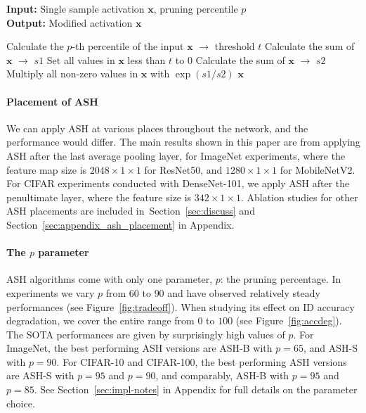 \documentclass{article}
\newcommand{\figref}[1]{Figure~\ref{fig:#1}}
\newcommand{\secref}[1]{Section~\ref{sec:#1}}
\newcommand{\alglabel}[1]{\label{alg:#1}}
\newcommand{\ac}{ASH\xspace}
\begin{document}
\begin{minipage}{0.34\textwidth}
    \begin{algorithm}[H]
    \small
    	\caption{\textbf{\textcolor{ashscolor}{ASH-S: Activation Shaping with Scaling}}}
\textbf{Input:} Single sample activation $\mathbf{x}$, pruning percentile $p$\\
        \textbf{Output:} Modified activation $\mathbf{x}$\\
        \begin{algorithmic}[1]
            \STATE Calculate the $p$-th percentile of the input $\mathbf{x}$ $\rightarrow$ threshold $t$
            \STATE Calculate the sum of $\mathbf{x}$ $\rightarrow$ $s1$
            \STATE Set all values in $\mathbf{x}$ less than $t$ to $0$
            \STATE Calculate the sum of $\mathbf{x}$ $\rightarrow$ $s2$
        	\vspace{0.35cm}
            \STATE Multiply all non-zero values in $\mathbf{x}$ with $\exp(s1/s2)$
            \RETURN $\mathbf{x}$
        \end{algorithmic}
    	\alglabel{ash-s}
    \end{algorithm}
\end{minipage}

\paragraph{Placement of ASH} 
We can apply \ac at various places throughout the network, and the performance would differ. The main results shown in this paper are from applying \ac after the last average pooling layer, for ImageNet experiments, where the feature map size is $2048\times1\times1$ for ResNet50, and $1280\times1\times1$ for MobileNetV2. For CIFAR experiments conducted with DenseNet-101, we apply \ac after the penultimate layer, where the feature size is $342\times1\times1$. Ablation studies for other ASH placements are included in~\secref{discuss} and \secref{appendix_ash_placement} in Appendix.



\paragraph{The $p$ parameter} \ac algorithms come with only one parameter, $p$: the pruning percentage. In experiments we vary $p$ from $60$ to $90$ and have observed relatively steady performances (see \figref{tradeoff}). When studying its effect on ID accuracy degradation, we cover the entire range from $0$ to $100$ (see \figref{accdeg}). The SOTA performances are given by surprisingly high values of $p$. For ImageNet, the best performing ASH versions are ASH-B with $p=65$, and ASH-S with $p=90$. For CIFAR-10 and CIFAR-100, the best performing ASH versions are ASH-S with $p=95$ and $p=90$, and comparably, ASH-B with $p=95$ and $p=85$. See \secref{impl-notes} in Appendix for full details on the parameter choice. 
\end{document}
